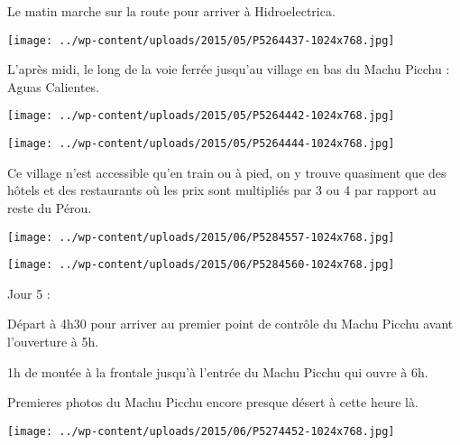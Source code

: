  Le matin marche sur la route pour arriver à Hidroelectrica. 

 

\begin{center} \texttt{[image: ../wp-content/uploads/2015/05/P5264437-1024x768.jpg]} \end{center}

 

 L'après midi, le long de la voie ferrée jusqu'au village en bas du Machu Picchu : Aguas Calientes. 

 

\begin{center} \texttt{[image: ../wp-content/uploads/2015/05/P5264442-1024x768.jpg]} \end{center}

 

 

\begin{center} \texttt{[image: ../wp-content/uploads/2015/05/P5264444-1024x768.jpg]} \end{center}

 

 Ce village n'est accessible qu'en train ou à pied, on y trouve quasiment que des hôtels et des restaurants où les prix sont multipliés par 3 ou 4 par rapport au reste du Pérou. 

 

\begin{center} \texttt{[image: ../wp-content/uploads/2015/06/P5284557-1024x768.jpg]} \end{center}

 

 

\begin{center} \texttt{[image: ../wp-content/uploads/2015/06/P5284560-1024x768.jpg]} \end{center}

 

 Jour 5 : 

 Départ à 4h30 pour arriver au premier point de contrôle du Machu Picchu avant l'ouverture à 5h. 

 1h de montée à la frontale jusqu'à l'entrée du Machu Picchu qui ouvre à 6h. 

 Premieres photos du Machu Picchu encore presque désert à cette heure là. 

 

\begin{center} \texttt{[image: ../wp-content/uploads/2015/06/P5274452-1024x768.jpg]} \end{center}

